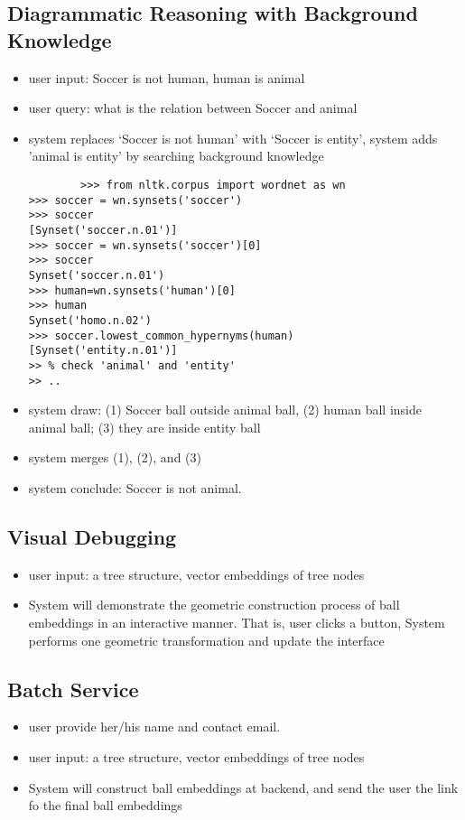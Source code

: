 \documentclass[runningheads]{llncs}
\begin{document}
\subsection{Diagrammatic Reasoning with Background Knowledge} 
\begin{itemize}
	\item user input: Soccer is not human, human is animal
	\item  user query: what is the relation between Soccer and animal
	\item  system replaces `Soccer is not human' with `Soccer is entity', system adds 'animal is entity' by searching background knowledge
	\begin{verbatim}
		>>> from nltk.corpus import wordnet as wn
>>> soccer = wn.synsets('soccer')
>>> soccer
[Synset('soccer.n.01')]
>>> soccer = wn.synsets('soccer')[0]
>>> soccer
Synset('soccer.n.01')
>>> human=wn.synsets('human')[0]
>>> human
Synset('homo.n.02') 
>>> soccer.lowest_common_hypernyms(human)
[Synset('entity.n.01')] 
>> % check 'animal' and 'entity'
>> ..
	\end{verbatim}
\item  system draw: (1) Soccer ball outside animal ball, (2) human ball inside animal ball; (3) they are inside entity ball 
	\item system merges (1), (2), and (3)  
	\item system conclude: Soccer is not animal.
\end{itemize}

\subsection{Visual Debugging}

\begin{itemize}
	\item user input: a tree structure, vector embeddings of tree nodes
	\item System will demonstrate the geometric construction process of ball embeddings in an interactive manner. That is, user clicks a button, System performs one geometric transformation and update the interface 
\end{itemize}

\subsection{Batch Service}

\begin{itemize}
	\item user provide her/his name and contact email.
	\item user input: a tree structure, vector embeddings of tree nodes
	\item System will construct ball embeddings at backend, and send the user the link fo the final ball embeddings  
\end{itemize}
\end{document}
